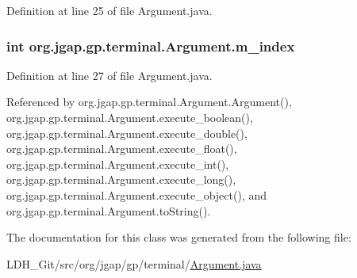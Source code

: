 Definition at line 25 of file Argument.\-java.

\hypertarget{classorg_1_1jgap_1_1gp_1_1terminal_1_1_argument_abb43ae28c3638e8f5ad85a75f628774a}{
\subsubsection[{m\-\_\-index}]{\setlength{\rightskip}{0pt plus 5cm}int org.\-jgap.\-gp.\-terminal.\-Argument.\-m\-\_\-index\hspace{0.3cm}{\ttfamily [private]}}}\label{classorg_1_1jgap_1_1gp_1_1terminal_1_1_argument_abb43ae28c3638e8f5ad85a75f628774a}


Definition at line 27 of file Argument.\-java.



Referenced by org.\-jgap.\-gp.\-terminal.\-Argument.\-Argument(), org.\-jgap.\-gp.\-terminal.\-Argument.\-execute\-\_\-boolean(), org.\-jgap.\-gp.\-terminal.\-Argument.\-execute\-\_\-double(), org.\-jgap.\-gp.\-terminal.\-Argument.\-execute\-\_\-float(), org.\-jgap.\-gp.\-terminal.\-Argument.\-execute\-\_\-int(), org.\-jgap.\-gp.\-terminal.\-Argument.\-execute\-\_\-long(), org.\-jgap.\-gp.\-terminal.\-Argument.\-execute\-\_\-object(), and org.\-jgap.\-gp.\-terminal.\-Argument.\-to\-String().



The documentation for this class was generated from the following file\-:\begin{DoxyCompactItemize}
\item 
L\-D\-H\-\_\-\-Git/src/org/jgap/gp/terminal/\hyperlink{_argument_8java}{Argument.\-java}\end{DoxyCompactItemize}
